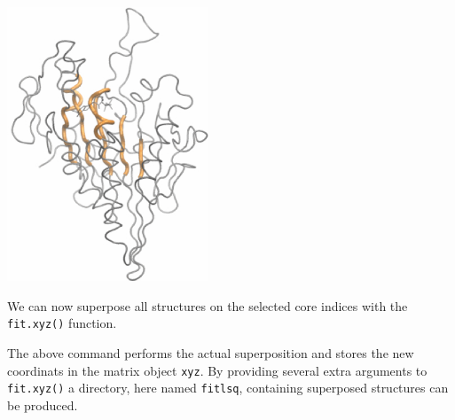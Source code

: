 \documentclass[a4paper]{article}
\begin{document}
\begin{center}
\includegraphics[width=60mm]{figs/core.png}
\end{center}
We can now superpose all structures on the selected core indices with the \texttt{fit.xyz()} function.
\begin{Schunk}
\end{Schunk}
The above command performs the actual superposition and stores the new coordinats in the matrix object \texttt{xyz}.  By providing several extra arguments to \texttt{fit.xyz()} a directory, here named \texttt{fitlsq}, containing superposed structures can be produced.
\end{document}
